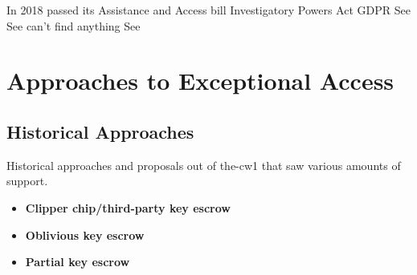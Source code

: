 \countriesstart
     In 2018 passed its Assistance and Access bill \cite{ag_2018} \cite{newman_2018}
     Investigatory Powers Act \cite{legislature_2016}
     GDPR \cite{parliament_2016}
     See \cite{donahue_comparative_2018}
     See \cite{donahue_comparative_2018}
     can't find anything
     See \cite{budish_encryption_2018}
\countriesend



\section{Approaches to Exceptional Access}
\label{sec-tech-approaches}



\subsection{Historical Approaches}

Historical approaches and proposals out of \ac{the-cw1} that saw various amounts of support.

\newcommand{\propsstart}[0]{\begin{itemize}}
\newcommand{\prop}[2]{\item \textbf{#1} \cite{#2}} %
\newcommand{\propsend}{\end{itemize}}

\propsstart
    \prop{Clipper chip/third-party key escrow}{press_1993}
    \prop{Oblivious key escrow}{goos_oblivious_1996}
    \prop{Partial key escrow}{denning_taxonomy_1996}
\propsend


